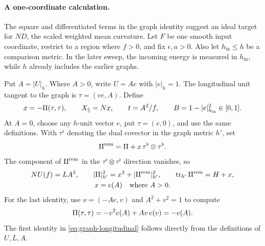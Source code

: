\paragraph{A one-coordinate calculation.}
The square and differentiated terms in the graph identity suggest
an ideal target for \(ND\), the scaled weighted mean curvature.
Let \(F\) be one smooth input coordinate, restrict
to a region where \(f>0\), and fix \(\epsilon,a>0\).  Also let
\(h_{\mathrm{in}}\le h\) be a comparison metric.  In the later sweep,
the incoming energy is measured in \(h_{\mathrm{in}}\), while \(h\)
already includes the earlier graphs.

Put \(A=|U|_h\).  Where \(A>0\), write \(U=Ae\) with \(|e|_h=1\).
The longitudinal unit tangent to the graph is
\(\tau=(ve,A)\).  Define
\[
 x=-\mathrm{II}(\tau,\tau),\qquad X_{\parallel}=Nx,\qquad t=A^2/f,\qquad
 B=1-|e|_{h_{\mathrm{in}}}^2\in[0,1].
\]
At \(A=0\), choose any \(h\)-unit vector \(e\), put \(\tau=(e,0)\),
and use the same definitions.  With \(\tau^\flat\) denoting the dual
covector in the graph metric \(h'\), set
\[
 \mathrm{II}^{\mathrm{rem}}=\mathrm{II}+x\,\tau^\flat\otimes\tau^\flat .
\]
The component of \(\mathrm{II}^{\mathrm{rem}}\) in the
\(\tau^\flat\otimes\tau^\flat\) direction vanishes, so
\begin{equation}
 \begin{gathered}
 NU(f)=LA^2,\qquad
 |\mathrm{II}|_{h'}^2=x^2+|\mathrm{II}^{\mathrm{rem}}|_{h'}^2,\qquad
 \operatorname{tr}_{h'}\mathrm{II}^{\mathrm{rem}}=H+x,\\
 x=e(A)\quad\text{where }A>0.
 \end{gathered}
 \label{eq:graph-longitudinal}
\end{equation}
For the last identity, use \(\nu=(-Ae,v)\) and \(A^2+v^2=1\) to
compute
\[
 \mathrm{II}(\tau,\tau)=-v^2e(A)+Av\,e(v)=-e(A).
\]
The first identity in \eqref{eq:graph-longitudinal} follows directly
from the definitions of \(U,L,A\).

